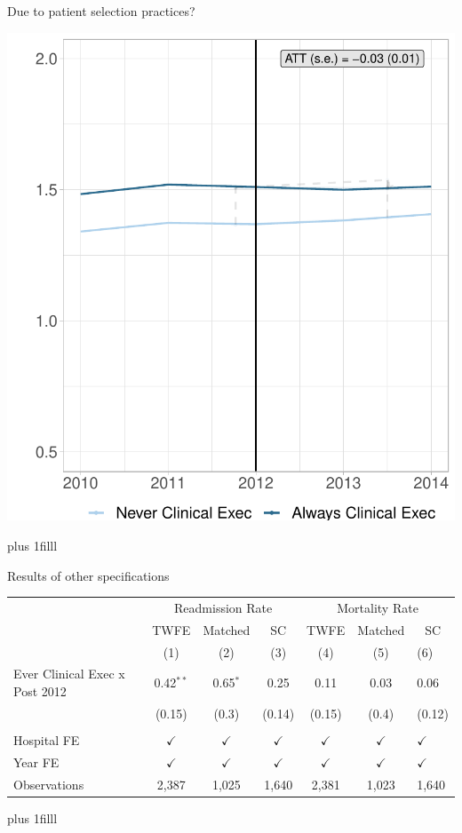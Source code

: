 \documentclass[notes,11pt, aspectratio=169]{beamer}
\newcommand{\btVFill}{\vskip0pt plus 1filll}
\begin{document}
\begin{frame}{Due to patient selection practices?}\label{cmi}
\begin{center}
    \includegraphics[width=.4\textwidth]{Objects/cmi_md_nomd_synth_graph.pdf}
\end{center}

\btVFill

\hyperlink{main:readrates}{}
    
\end{frame}

\begin{frame}{Results of other specifications}\label{specifications}
    \begin{table}[ht!]
\centering
\begin{tabular}[t]{lcccccl}
\toprule
\multicolumn{1}{c}{} & \multicolumn{3}{c}{Readmission Rate} & \multicolumn{3}{c}{Mortality Rate} \\
\cmidrule(l{3pt}r{3pt}){2-4} \cmidrule(l{3pt}r{3pt}){5-7}
\multicolumn{1}{c}{ } & \multicolumn{1}{c}{TWFE} & \multicolumn{1}{c}{Matched} & \multicolumn{1}{c}{SC} & \multicolumn{1}{c}{TWFE} & \multicolumn{1}{c}{Matched} & \multicolumn{1}{c}{SC} \\
\cmidrule(l{3pt}r{3pt}){2-2} \cmidrule(l{3pt}r{3pt}){3-3} \cmidrule(l{3pt}r{3pt}){4-4} \cmidrule(l{3pt}r{3pt}){5-5} \cmidrule(l{3pt}r{3pt}){6-6} \cmidrule(l{3pt}r{3pt}){7-7}
 & (1) & (2) & (3) & (4) & (5) & (6)\\
\midrule
Ever Clinical Exec x Post 2012 & 0.42$^{**}$ & 0.65$^{*}$ & 0.25 & 0.11 & 0.03 & 0.06\\
 & (0.15) & (0.3) & (0.14) & (0.15) & (0.4) & (0.12)\\
 &  &  &  &  &  & \\
Hospital FE & $\checkmark$ & $\checkmark$ & $\checkmark$ & $\checkmark$ & $\checkmark$ & $\checkmark$\\
Year FE & $\checkmark$ & $\checkmark$ & $\checkmark$ & $\checkmark$ & $\checkmark$ & $\checkmark$\\
\addlinespace
Observations & 2,387 & 1,025 & 1,640 & 2,381 & 1,023 & 1,640\\
\bottomrule
\end{tabular}
\end{table}

\btVFill

\hyperlink{main:readrates}{}
\end{frame}
\end{document}
